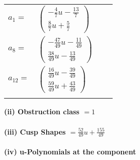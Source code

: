 \documentclass[1p]{elsarticle_modified}
\theoremstyle{definition}
\begin{document}
\begin{tabular}{m{7pt} m{180pt} m{7pt} m{180pt} }
\flushright $a_{1}=$&$\begin{pmatrix}-\frac{4}{7} u-\frac{13}{7}\\\frac{8}{7} u+\frac{5}{7}\end{pmatrix}$ \\
\flushright $a_{8}=$&$\begin{pmatrix}-\frac{47}{49} u-\frac{11}{49}\\\frac{38}{49} u-\frac{13}{49}\end{pmatrix}$ \\
\flushright $a_{12}=$&$\begin{pmatrix}\frac{16}{49} u-\frac{39}{49}\\\frac{59}{49} u+\frac{43}{49}\end{pmatrix}$\\&\end{tabular}
\flushleft \textbf{(ii) Obstruction class $= 1$}\\~\\
\flushleft \textbf{(iii) Cusp Shapes $= \frac{52}{49} u+\frac{155}{49}$}\\~\\
\newpage\renewcommand{\arraystretch}{1}
\flushleft \textbf{(iv) u-Polynomials at the component}\newline \\
\end{document}
